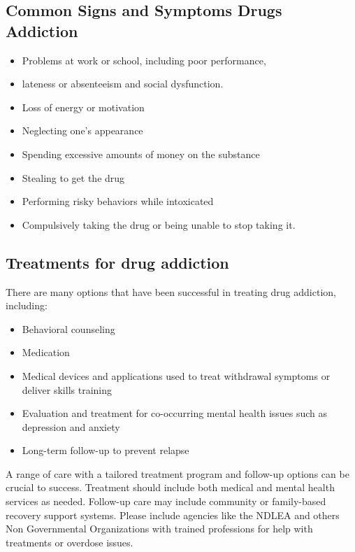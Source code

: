 \documentclass{report}
\begin{document}
\subsection{Common Signs and Symptoms Drugs Addiction }
\begin{itemize}
    \item Problems at work or school, including poor performance,
    \item lateness or absenteeism and social dysfunction.
    \item Loss of energy or motivation
    \item Neglecting one’s appearance
    \item Spending excessive amounts of money on the substance
    \item Stealing to get the drug
    \item Performing risky behaviors while intoxicated
    \item Compulsively taking the drug or being unable to stop taking it.
\end{itemize}

\subsection{Treatments for drug addiction}
There are many options that have been successful in treating drug addiction, including:
\begin{itemize}
\item Behavioral counseling
\item Medication
\item Medical devices and applications used to treat withdrawal symptoms  or deliver skills training
\item Evaluation and treatment for co-occurring mental health issues such as depression and anxiety
\item Long-term follow-up to prevent relapse
\end{itemize}

A range of care with a tailored treatment program and follow-up options can be crucial to success. Treatment should include both medical and mental health services as needed. Follow-up care may include community or family-based recovery support systems. Please include agencies like the NDLEA and others Non Governmental Organizations with trained professions for help with treatments or overdose issues.
\end{document}
